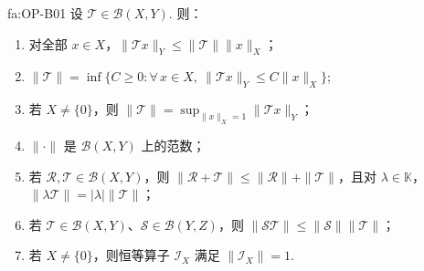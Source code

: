 \begin{FATheorem}[B][算子范数基本估计]{fa:OP-B01}
设 \(\displaystyle \mathcal T\in\mathcal B(X,Y)\). 则：
\begin{enumerate}[label=\textnormal{(\roman*)}]
\item 对全部 \(\displaystyle x\in X\)，\(\displaystyle \|\mathcal T x\|_Y\leqslant\|\mathcal T\|\|x\|_X\)；
\item \(\displaystyle \|\mathcal T\| =\inf\{C\geqslant0:\forall\,x\in X,\ \|\mathcal T x\|_Y\leqslant C\|x\|_X\}\);
\item 若 \(\displaystyle X\neq\{0\}\)，则 \(\displaystyle \|\mathcal T\| =\sup_{\|x\|_X=1}\|\mathcal T x\|_Y\)；
\item \(\displaystyle \|\cdot\|\) 是 \(\displaystyle \mathcal B(X,Y)\) 上的范数；
\item 若 \(\displaystyle \mathcal R,\mathcal T\in\mathcal B(X,Y)\)，则 \(\displaystyle \|\mathcal R+\mathcal T\|\leqslant\|\mathcal R\|+\|\mathcal T\|\)，且对 \(\displaystyle \lambda\in\mathbb K\)，\(\displaystyle \|\lambda\mathcal T\|=|\lambda|\|\mathcal T\|\)；
\item 若 \(\displaystyle \mathcal T\in\mathcal B(X,Y)\)、\(\displaystyle \mathcal S\in\mathcal B(Y,Z)\)，则 \(\displaystyle \|\mathcal S\mathcal T\|\leqslant\|\mathcal S\|\|\mathcal T\|\)；
\item 若 \(\displaystyle X\neq\{0\}\)，则恒等算子 \(\displaystyle \mathcal I_X\) 满足 \(\displaystyle \|\mathcal I_X\|=1\).
\end{enumerate}
\end{FATheorem}

